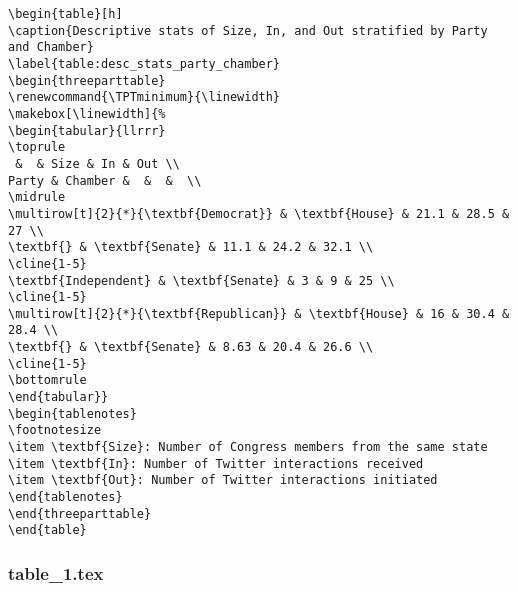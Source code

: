 \documentclass[11pt]{article}
\begin{document}
\begin{Verbatim}[tabsize=4]
\begin{table}[h]
\caption{Descriptive stats of Size, In, and Out stratified by Party and Chamber}
\label{table:desc_stats_party_chamber}
\begin{threeparttable}
\renewcommand{\TPTminimum}{\linewidth}
\makebox[\linewidth]{%
\begin{tabular}{llrrr}
\toprule
 &  & Size & In & Out \\
Party & Chamber &  &  &  \\
\midrule
\multirow[t]{2}{*}{\textbf{Democrat}} & \textbf{House} & 21.1 & 28.5 & 27 \\
\textbf{} & \textbf{Senate} & 11.1 & 24.2 & 32.1 \\
\cline{1-5}
\textbf{Independent} & \textbf{Senate} & 3 & 9 & 25 \\
\cline{1-5}
\multirow[t]{2}{*}{\textbf{Republican}} & \textbf{House} & 16 & 30.4 & 28.4 \\
\textbf{} & \textbf{Senate} & 8.63 & 20.4 & 26.6 \\
\cline{1-5}
\bottomrule
\end{tabular}}
\begin{tablenotes}
\footnotesize
\item \textbf{Size}: Number of Congress members from the same state
\item \textbf{In}: Number of Twitter interactions received
\item \textbf{Out}: Number of Twitter interactions initiated
\end{tablenotes}
\end{threeparttable}
\end{table}

\end{Verbatim}

\subsubsection*{table\_1.tex}
\end{document}
